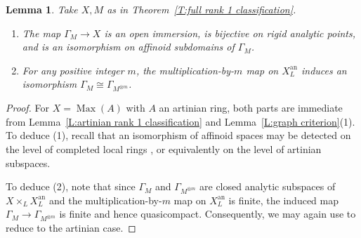 \documentclass[12pt]{article}
\newtheorem{lemma}[theorem]{Lemma}
\theoremstyle{definition}
\numberwithin{equation}{theorem}
\newcommand{\an}{\mathrm{an}}
\DeclareMathOperator{\Max}{Max}
\begin{document}
\begin{lemma} \label{L:open immersion}
Take $X,M$ as in Theorem~\ref{T:full rank 1 classification}.
\begin{enumerate}
\item[(1)]
The map $\Gamma_M \to X$ is an open immersion, is bijective on rigid analytic points, and is an isomorphism on affinoid subdomains of $\Gamma_M$.
\item[(2)]
For any positive integer $m$, the multiplication-by-$m$ map on $X^{\an}_L$ induces an isomorphism $\Gamma_M \cong \Gamma_{M^{\otimes m}}$.
\end{enumerate}
\end{lemma}
\begin{proof}
For $X = \Max(A)$ with $A$ an artinian ring, both parts are immediate from Lemma~\ref{L:artinian rank 1 classification} and
Lemma~\ref{L:graph criterion}(1). To deduce (1), recall that an isomorphism of affinoid spaces may be detected on the level of completed local rings \cite[Proposition~7.3.3/5]{BGR},
or equivalently on the level of artinian subspaces.

To deduce (2), note that since $\Gamma_M$ and $\Gamma_{M^{\otimes m}}$ are closed analytic subspaces of $X \times_L X^{\an}_L$ and the multiplication-by-$m$ map on $X^{\an}_L$ is finite, the induced map $\Gamma_M \to \Gamma_{M^{\otimes m}}$ is finite and hence quasicompact. Consequently, we may again use
\cite[Proposition~7.3.3/5]{BGR} to reduce to the artinian case.
\end{proof}
\end{document}
